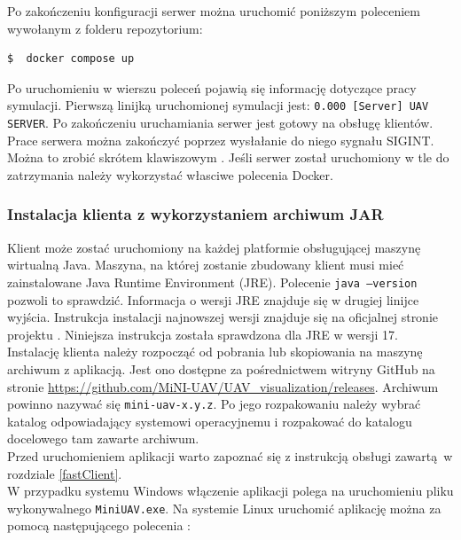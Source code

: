 \documentclass[15pt]{sprawozdanie}
\begin{document}
Po zakończeniu konfiguracji serwer można uruchomić poniższym poleceniem wywołanym z folderu repozytorium:
\begin{lstlisting}[language=bash]
  $  docker compose up
\end{lstlisting}
Po uruchomieniu w wierszu poleceń pojawią się informację dotyczące pracy symulacji. Pierwszą linijką uruchomionej symulacji jest: \texttt{0.000 [Server] UAV SERVER}. Po zakończeniu uruchamiania serwer jest gotowy na obsługę klientów.\\

Prace serwera można zakończyć poprzez wysłałanie do niego sygnału SIGINT. Można to zrobić skrótem klawiszowym . Jeśli serwer został uruchomiony w tle do zatrzymania należy wykorzystać własciwe polecenia Docker.

\subsubsection{Instalacja klienta z wykorzystaniem archiwum JAR}
\label{javaInst}

Klient może zostać uruchomiony na każdej platformie obsługującej maszynę wirtualną Java. 
Maszyna, na której zostanie zbudowany klient musi mieć zainstalowane Java Runtime Environment (JRE). Polecenie \texttt{java --version} pozwoli to sprawdzić. Informacja o wersji JRE znajduje się w drugiej linijce wyjścia. Instrukcja instalacji najnowszej wersji znajduje się na oficjalnej stronie projektu \cite{java}. Niniejsza instrukcja została sprawdzona dla JRE w wersji 17. \\

Instalację klienta należy rozpocząć od pobrania lub skopiowania na maszynę archiwum z aplikacją. Jest ono dostępne za pośrednictwem witryny GitHub na stronie \url{https://github.com/MiNI-UAV/UAV\_visualization/releases}. Archiwum powinno nazywać się \texttt{mini-uav-x.y.z}. Po jego rozpakowaniu należy wybrać katalog odpowiadający systemowi operacyjnemu i rozpakować do katalogu docelowego tam zawarte archiwum. \\

Przed uruchomieniem aplikacji warto zapoznać się z instrukcją obsługi zawartą w rozdziale \ref{fastClient}. \\

W przypadku systemu Windows włączenie aplikacji polega na uruchomieniu pliku wykonywalnego \texttt{MiniUAV.exe}. Na systemie Linux uruchomić aplikację można za pomocą następującego polecenia :
\end{document}

